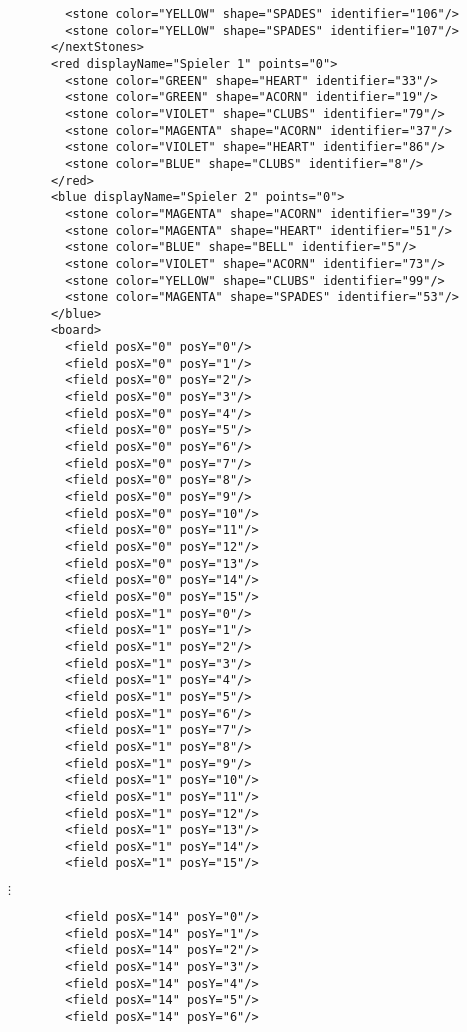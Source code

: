 \documentclass[12pt,a4paper, ngerman, oneside]{scrartcl}
\begin{document}
\begin{enumerate}
\begin{verbatim}
        <stone color="YELLOW" shape="SPADES" identifier="106"/>
        <stone color="YELLOW" shape="SPADES" identifier="107"/>
      </nextStones>
      <red displayName="Spieler 1" points="0">
        <stone color="GREEN" shape="HEART" identifier="33"/>
        <stone color="GREEN" shape="ACORN" identifier="19"/>
        <stone color="VIOLET" shape="CLUBS" identifier="79"/>
        <stone color="MAGENTA" shape="ACORN" identifier="37"/>
        <stone color="VIOLET" shape="HEART" identifier="86"/>
        <stone color="BLUE" shape="CLUBS" identifier="8"/>
      </red>
      <blue displayName="Spieler 2" points="0">
        <stone color="MAGENTA" shape="ACORN" identifier="39"/>
        <stone color="MAGENTA" shape="HEART" identifier="51"/>
        <stone color="BLUE" shape="BELL" identifier="5"/>
        <stone color="VIOLET" shape="ACORN" identifier="73"/>
        <stone color="YELLOW" shape="CLUBS" identifier="99"/>
        <stone color="MAGENTA" shape="SPADES" identifier="53"/>
      </blue>
      <board>
        <field posX="0" posY="0"/>
        <field posX="0" posY="1"/>
        <field posX="0" posY="2"/>
        <field posX="0" posY="3"/>
        <field posX="0" posY="4"/>
        <field posX="0" posY="5"/>
        <field posX="0" posY="6"/>
        <field posX="0" posY="7"/>
        <field posX="0" posY="8"/>
        <field posX="0" posY="9"/>
        <field posX="0" posY="10"/>
        <field posX="0" posY="11"/>
        <field posX="0" posY="12"/>
        <field posX="0" posY="13"/>
        <field posX="0" posY="14"/>
        <field posX="0" posY="15"/>
        <field posX="1" posY="0"/>
        <field posX="1" posY="1"/>
        <field posX="1" posY="2"/>
        <field posX="1" posY="3"/>
        <field posX="1" posY="4"/>
        <field posX="1" posY="5"/>
        <field posX="1" posY="6"/>
        <field posX="1" posY="7"/>
        <field posX="1" posY="8"/>
        <field posX="1" posY="9"/>
        <field posX="1" posY="10"/>
        <field posX="1" posY="11"/>
        <field posX="1" posY="12"/>
        <field posX="1" posY="13"/>
        <field posX="1" posY="14"/>
        <field posX="1" posY="15"/>
        \end{verbatim}
        \hspace{130px}$\vdots$
        \begin{verbatim}
        <field posX="14" posY="0"/>
        <field posX="14" posY="1"/>
        <field posX="14" posY="2"/>
        <field posX="14" posY="3"/>
        <field posX="14" posY="4"/>
        <field posX="14" posY="5"/>
        <field posX="14" posY="6"/>

\end{verbatim}
\end{enumerate}
\end{document}
